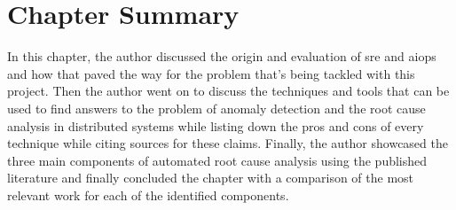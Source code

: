 \section{Chapter Summary}

In this chapter, the author discussed the origin and evaluation of \ac{sre} and \ac{aiops} and how that paved the way for the problem that's being tackled with this project. Then the author went on to discuss the techniques and tools that can be used to find answers to the problem of anomaly detection and the root cause analysis in distributed systems while listing down the pros and cons of every technique while citing sources for these claims. Finally, the author showcased the three main components of automated root cause analysis using the published literature and finally concluded the chapter with a comparison of the most relevant work for each of the identified components.